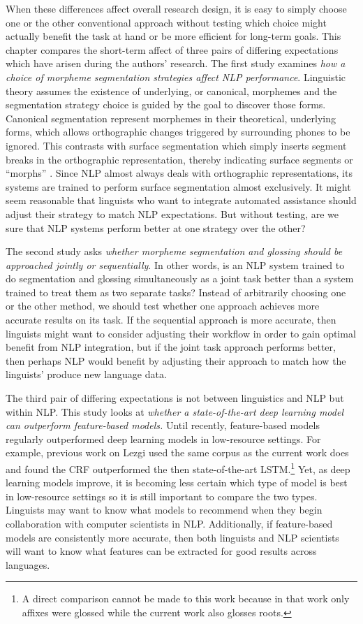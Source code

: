 When these differences affect overall research design, it is easy to simply choose one or the other conventional approach without testing which choice might actually benefit the task at hand or be more efficient for long-term goals. This chapter compares the short-term affect of three pairs of differing expectations which have arisen during the authors' research. 
The first study examines \textit{how a choice of morpheme segmentation strategies affect NLP performance}. Linguistic theory assumes the existence of underlying, or canonical, morphemes and the segmentation strategy choice is guided by the goal to discover those forms. Canonical segmentation represent morphemes in their theoretical, underlying forms, which allows orthographic changes triggered by surrounding phones to be ignored. This contrasts with surface segmentation which simply inserts segment breaks in the orthographic representation, thereby indicating surface segments or ``morphs'' \citep{virpioja_empirical_2011}. Since NLP almost always deals with orthographic representations, its systems are trained to perform surface segmentation almost exclusively. 
It might seem reasonable that linguists who want to integrate automated assistance should adjust their strategy to match NLP expectations. But without testing, are we sure that NLP systems perform better at one strategy over the other?

The second study asks \textit{whether morpheme segmentation and glossing should be approached jointly or sequentially}. In other words, is an NLP system trained to do segmentation and glossing simultaneously as a joint task better than a system trained to treat them as two separate tasks? Instead of arbitrarily choosing one or the other method, we should test whether one approach achieves more accurate results on its task. If the sequential approach is more accurate, then linguists might want to consider adjusting their workflow in order to gain optimal benefit from NLP integration, but if the joint task approach performs better, then perhaps NLP would benefit by adjusting their approach to match how the linguists' produce new language data.

The third pair of differing expectations is not between linguistics and NLP but within NLP. This study looks at \textit{whether a state-of-the-art deep learning model can outperform feature-based models.} Until recently, feature-based models regularly outperformed deep learning models in low-resource settings. For example, previous work on Lezgi \citep{moeller_automatic_2018} used the same corpus as the current work does and found the CRF outperformed the then state-of-the-art LSTM.\footnote{A direct comparison cannot be made to this work because in that work only affixes were glossed while the current work also glosses roots.} Yet, as deep learning models improve, it is becoming less certain which type of model is best in low-resource settings so it is still important to compare the two types. Linguists may want to know what models to recommend when they begin collaboration with computer scientists in NLP. Additionally, if feature-based models are consistently more accurate, then both linguists and NLP scientists will want to know what features can be extracted for good results across languages. 

